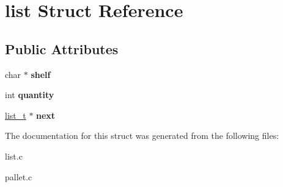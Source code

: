 \hypertarget{structlist}{}\section{list Struct Reference}
\label{structlist}
\subsection*{Public Attributes}
\begin{DoxyCompactItemize}
\item 
\hypertarget{structlist_a6384ab811fb5c30f8e9e3dccad6290ce}{}char $\ast$ {\bfseries shelf}\label{structlist_a6384ab811fb5c30f8e9e3dccad6290ce}

\item 
\hypertarget{structlist_adae2baaa9e090879c4bc5f26214df768}{}int {\bfseries quantity}\label{structlist_adae2baaa9e090879c4bc5f26214df768}

\item 
\hypertarget{structlist_a5def05136dcfba282574eac373248a49}{}\hyperlink{structlist}{list\+\_\+t} $\ast$ {\bfseries next}\label{structlist_a5def05136dcfba282574eac373248a49}

\end{DoxyCompactItemize}


The documentation for this struct was generated from the following files\+:\begin{DoxyCompactItemize}
\item 
list.\+c\item 
pallet.\+c\end{DoxyCompactItemize}
